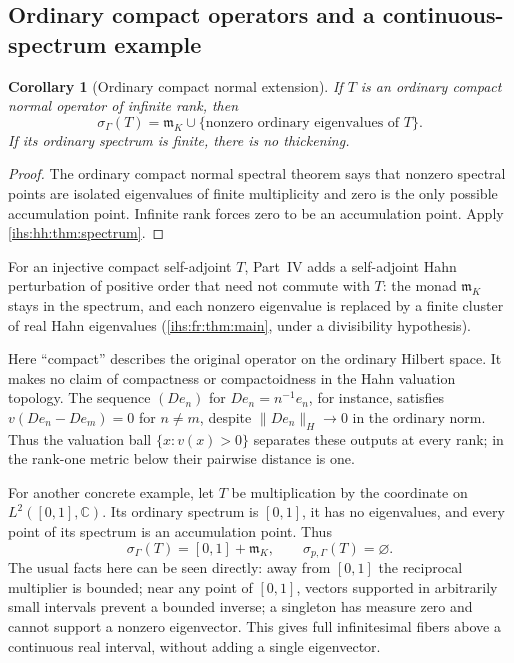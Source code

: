 \documentclass[11pt,a4paper]{article}
\numberwithin{equation}{section}
\newtheorem{corollary}[corollary]{Corollary}
\theoremstyle{definition}
\theoremstyle{remark}
\newcommand{\C}{\mathbb C}
\newcommand{\mK}{\mathfrak m_K}
\newcommand{\norm}[1]{\lVert#1\rVert}
\begin{document}
\subsection{Ordinary compact operators and a continuous-spectrum example}\label{ihs:hh:sec:compact}
\begin{corollary}[Ordinary compact normal extension]\label{ihs:hh:cor:compact}
If $T$ is an ordinary compact normal operator of infinite rank, then
\[
 \sigma_\Gamma(T)=\mK\cup\{\text{nonzero ordinary eigenvalues of }T\}.
\]
If its ordinary spectrum is finite, there is no thickening.
\end{corollary}
\begin{proof}
The ordinary compact normal spectral theorem says that nonzero spectral
points are isolated eigenvalues of finite multiplicity and zero is the only
possible accumulation point. Infinite rank forces zero to be an accumulation
point. Apply \cref{ihs:hh:thm:spectrum}.
\end{proof}

For an injective compact self-adjoint $T$, Part~IV adds a self-adjoint Hahn
perturbation of positive order that need not commute with $T$: the monad
$\mK$ stays in the spectrum, and each nonzero eigenvalue is replaced by a
finite cluster of real Hahn eigenvalues (\cref{ihs:fr:thm:main}, under a
divisibility hypothesis).

Here ``compact'' describes the original operator on the ordinary Hilbert
space. It makes no claim of compactness or compactoidness in the Hahn
valuation topology. The sequence $(De_n)$ for $De_n=n^{-1}e_n$, for
instance, satisfies $v(De_n-De_m)=0$ for $n\ne m$, despite
$\norm{De_n}_H\to0$ in the ordinary norm. Thus the valuation ball
$\{x:v(x)>0\}$ separates these outputs at every rank; in the rank-one
metric below their pairwise distance is one.

For another concrete example, let $T$ be multiplication by the coordinate on
$L^2([0,1],\C)$. Its ordinary spectrum is $[0,1]$, it has no eigenvalues,
and every point of its spectrum is an accumulation point. Thus
\[
 \sigma_\Gamma(T)=[0,1]+\mK,\qquad \sigma_{p,\Gamma}(T)=\varnothing.
\]
The usual facts here can be seen directly: away from $[0,1]$ the reciprocal
multiplier is bounded; near any point of $[0,1]$, vectors supported in
arbitrarily small intervals prevent a bounded inverse; a singleton has
measure zero and cannot support a nonzero eigenvector. This gives full
infinitesimal fibers above a continuous real interval, without adding a
single eigenvector.
\end{document}
